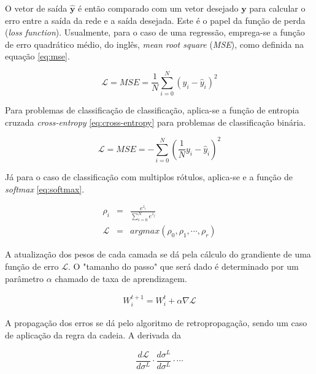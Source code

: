O vetor de saída $\boldsymbol{\hat{y}}$ é então comparado com um vetor desejado 
$\boldsymbol{y}$ para calcular o erro entre a saída da rede e a saída desejada.
Este é o papel da função de perda (\textit{loss function}). 
Usualmente, para o caso de uma regressão, emprega-se a função de erro quadrático médio, 
do inglês, \textit{mean root square} (\textit{MSE}), como definida na equação
\ref{eq:mse}.

\begin{equation}\label{eq:mse}
    \mathcal{L} = MSE = \frac{1}{N} \sum_{i=0}^{N}(y_i - \hat{y}_i)^{2}
\end{equation}

Para problemas de classificação de classificação, aplica-se a função de entropia
cruzada \textit{cross-entropy} \ref{eq:cross-entropy} para problemas de 
classificação binária.

\begin{equation}\label{eq:cross-entropy}
    \mathcal{L} = MSE = - \sum_{i=0}^{N}(\frac{1}{N} y_i - \hat{y}_i)^{2}
\end{equation}

Já para o caso de classificação com multiplos rótulos, aplica-se e a função 
de \textit{softmax} \ref{eq:softmax}.

\begin{eqnarray}
    \rho_i &=& \frac{e^{z_i}}{\sum_{i=0}^{N}e^{z_j}} \\
    \mathcal{L} &=& arg max (\rho_0, \rho_1, \cdots, \rho_r) \label{eq:softmax}
\end{eqnarray}

A atualização dos pesos de cada camada se dá pela cálculo do grandiente
de uma função de erro $\mathcal{L}$. O "tamanho do passo" que será dado
é determinado por um parâmetro $\alpha$ chamado de taxa de aprendizagem.

\begin{eqnarray}\label{eq:atualizacao-parametros-redes}
    W_i^{t + 1} = W_i^{t} + \alpha \nabla \mathcal{L}
\end{eqnarray}

A propagação dos erros se dá pelo algoritmo de retropropagação, sendo um caso 
de aplicação da regra da cadeia. A derivada da  

\begin{equation}\label{eq:derivida-loss}
    \frac{d\mathcal{L}}{d\sigma^{L}} \cdot 
    \frac{d\sigma^{L}}{d\sigma^{L}} \cdot
    \cdots
\end{equation}



